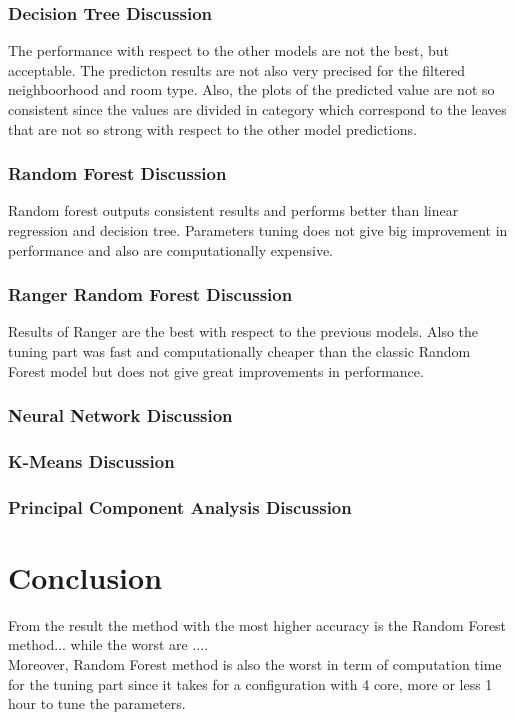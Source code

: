 \documentclass{FR16}
\begin{document}
\subsubsection{Decision Tree Discussion}
The performance with respect to the other models are not the best, but acceptable. The predicton results are not also very precised for the filtered neighboorhood 
and room type. Also, the plots of the predicted value are not so consistent since the values are divided in category which correspond to the leaves that are not so strong
with respect to the other model predictions.
\\

\subsubsection{Random Forest Discussion}
Random forest outputs consistent results and performs  better than linear regression and decision tree. 
Parameters tuning does not give big improvement in performance and also are computationally expensive.
\\

\subsubsection{Ranger Random Forest Discussion}
Results of Ranger are the best with respect to the previous models. Also the tuning part was fast and computationally cheaper than 
the classic Random Forest model but does not give great improvements in performance.
\\
\subsubsection{Neural Network Discussion}
\subsubsection{K-Means Discussion}
\subsubsection{Principal Component Analysis Discussion}

\newpage

\section{Conclusion}

From the result the method with the most higher accuracy is the Random Forest method... while the worst are ....
\\Moreover, Random Forest method is also the worst in term of computation time for the tuning part since it takes for a configuration with 4 core, more or less 1 hour to tune the parameters. 
\end{document}
